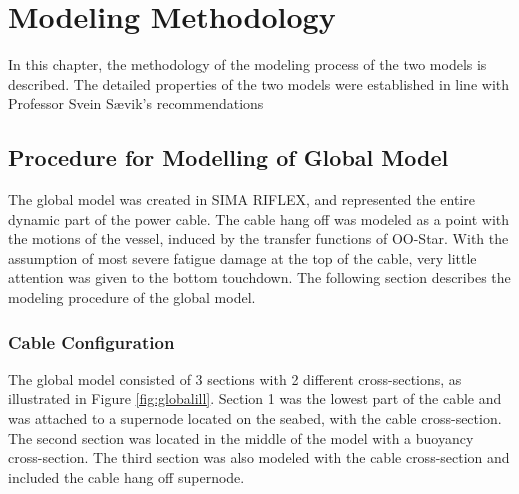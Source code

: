 \chapter{Modeling Methodology}
\label{chap:procedure}
In this chapter, the methodology of the modeling process of the two models is described. The detailed properties of the two models were established in line with Professor Svein Sævik's recommendations
\section{Procedure for Modelling of Global Model}
\label{sec:globmod}
The global model was created in SIMA RIFLEX, and represented the entire dynamic part of the power cable. The cable hang off was modeled as a point with the motions of the vessel, induced by the transfer functions of OO-Star. With the assumption of most severe fatigue damage at the top of the cable, very little attention was given to the bottom touchdown. The following section describes the modeling procedure of the global model.
\subsection{Cable Configuration}
The global model consisted of 3 sections with 2 different cross-sections, as illustrated in Figure \ref{fig:globalill}.  Section 1 was the lowest part of the cable and was attached to a supernode located on the seabed, with the cable cross-section. The second section was located in the middle of the model with a buoyancy cross-section. The third section was also modeled with the cable cross-section and included the cable hang off supernode. 

